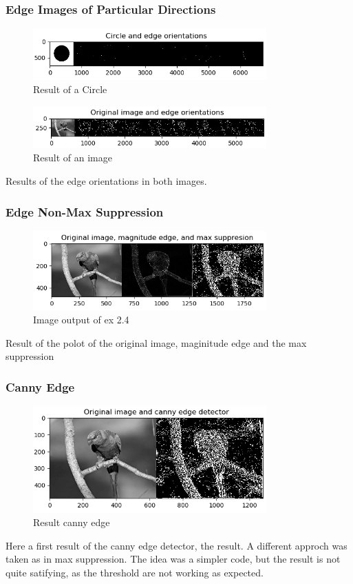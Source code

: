 \documentclass[12pt]{article}
\begin{document}
\newpage
\subsubsection{Edge Images of Particular Directions}
\begin{figure}[!htb]
  \centering
  \includegraphics[width=0.8\textwidth]{pics/2_3_s}
  \caption{Result of a Circle}
\end{figure}
\begin{figure}[!htb]
  \centering
  \includegraphics[width=0.8\textwidth]{pics/2_3_s2}
  \caption{Result of an image}
\end{figure}
Results of the edge orientations in both images.

\subsubsection{Edge Non-Max Suppression}
\begin{figure}[!htb]
  \centering
  \includegraphics[width=0.8\textwidth]{pics/2_4_s}
  \caption{Image output of ex 2.4}
\end{figure}
Result of the polot of the original image, maginitude edge and the max suppression

\newpage
\subsubsection{Canny Edge}
\begin{figure}[!htb]
  \centering
  \includegraphics[width=0.8\textwidth]{pics/2_5_s}
  \caption{Result canny edge}
\end{figure}
Here a first result of the canny edge detector, the result. A different approch was taken as in max suppression.
The idea was a simpler code, but the result is not quite satifying, as the threshold are not working as expected.
\end{document}
